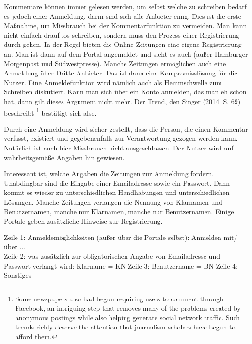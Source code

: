Kommentare können immer gelesen werden, um selbst welche zu schreiben bedarf es jedoch einer Anmeldung, darin sind sich alle Anbieter einig. Dies ist die erste Maßnahme, um Missbrauch bei der Kommentarfunktion zu vermeiden. Man kann nicht einfach drauf los schreiben, sondern muss den Prozess einer Registrierung durch gehen. In der Regel bieten die Online-Zeitungen eine eigene Registrierung an. Man ist dann auf dem Portal angemeldet und sieht es auch (außer Hamburger Morgenpost und Südwestpresse). Manche Zeitungen ermöglichen auch eine Anmeldung über Dritte Anbieter. Das ist dann eine Kompromisslösung für die Nutzer. Eine Anmeldefunktion wird nämlich auch als Hemmschwelle zum Schreiben diskutiert. Kann man sich über ein Konto anmelden, das man eh schon hat, dann gilt dieses Argument nicht mehr. Der Trend, den Singer (2014, S. 69) beschreibt \footnote{\glqq
Some newspapers also had begun requiring users to
comment through Facebook, an intriguing step that removes many of the problems created
by anonymous postings while also helping generate social network traffic. Such
trends richly deserve the attention that journalism scholars have begun to afford them.} bestätigt sich also.

Durch eine Anmeldung wird sicher gestellt, dass die Person, die einen Kommentar verfasst, existiert und gegebenenfalls zur Verantwortung gezogen werden kann. Natürlich ist auch hier Missbrauch nicht ausgeschlossen. Der Nutzer wird auf wahrheitsgemäße Angaben hin gewiesen. 

Interessant ist, welche Angaben die Zeitungen zur Anmeldung fordern. Unabdingbar sind die Eingabe einer Emailadresse sowie ein Passwort. Dann kommt es wieder zu unterschiedlichen Handhabungen und unterschiedlichen Lösungen. Manche Zeitungen verlangen die Nennung von Klarnamen und Benutzernamen, manche nur Klarnamen, manche nur Benutzernamen. Einige Portale geben zusätzliche Hinweise zur Registrierung. 

Zeile 1: Anmeldemöglichkeiten (außer über die Portale selbst): Anmelden mit/über ... \\
Zeile 2: was zusätzlich zur obligatorischen Angabe von Emailadresse und Passwort verlangt wird: Klarname = KN
Zeile 3: Benutzername = BN
Zeile 4: Sonstiges
	
